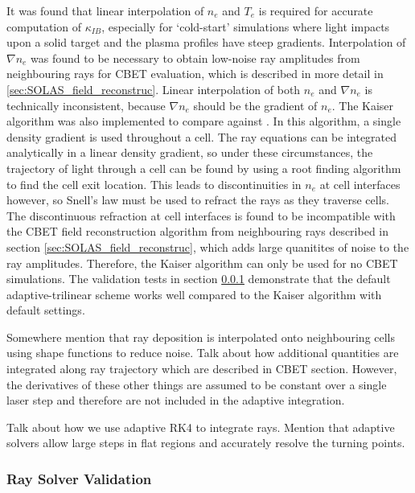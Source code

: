 It was found that linear interpolation of $n_e$ and $T_e$ is required for accurate computation of $\kappa_{IB}$, especially for `cold-start' simulations where light impacts upon a solid target and the plasma profiles have steep gradients.
Interpolation of $\nabla n_e$ was found to be necessary to obtain low-noise ray amplitudes from neighbouring rays for \ac{CBET} evaluation, which is described in more detail in \ref{sec:SOLAS_field_reconstruc}.
Linear interpolation of both $n_e$ and $\nabla n_e$ is technically inconsistent, because $\nabla n_e$ should be the gradient of $n_e$.
The Kaiser algorithm was also implemented to compare against \cite{kaiser_laser_2000}.
In this algorithm, a single density gradient is used throughout a cell.
The ray equations can be integrated analytically in a linear density gradient, so under these circumstances, the trajectory of light through a cell can be found by using a root finding algorithm to find the cell exit location.
This leads to discontinuities in $n_e$ at cell interfaces however, so Snell's law must be used to refract the rays as they traverse cells.
The discontinuous refraction at cell interfaces is found to be incompatible with the \ac{CBET} field reconstruction algorithm from neighbouring rays described in section \ref{sec:SOLAS_field_reconstruc}, which adds large quanitites of noise to the ray amplitudes.
Therefore, the Kaiser algorithm can only be used for no \ac{CBET} simulations.
The validation tests in section \ref{sec:SOLAS_ray_validation} demonstrate that the default adaptive-trilinear scheme works well compared to the Kaiser algorithm with default settings.

Somewhere mention that ray deposition is interpolated onto neighbouring cells using shape functions to reduce noise.
Talk about how additional quantities are integrated along ray trajectory which are described in CBET section.
However, the derivatives of these other things are assumed to be constant over a single laser step and therefore are not included in the adaptive integration.

Talk about how we use adaptive RK4 to integrate rays.
Mention that adaptive solvers allow large steps in flat regions and accurately resolve the turning points.

\subsubsection{Ray Solver Validation}
\label{sec:SOLAS_ray_validation}

